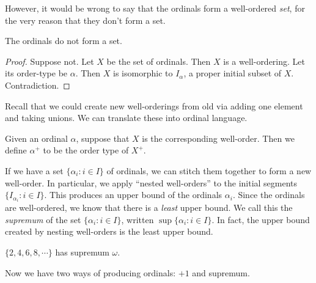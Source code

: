 \documentclass[a4paper]{article}
\begin{document}
However, it would be wrong to say that the ordinals form a well-ordered \emph{set}, for the very reason that they don't form a set.
\begin{thm}
  The ordinals do not form a set.
\end{thm}

\begin{proof}
  Suppose not. Let $X$ be the set of ordinals. Then $X$ is a well-ordering. Let its order-type be $\alpha$. Then $X$ is isomorphic to $I_\alpha$, a proper initial subset of $X$. Contradiction.
\end{proof}

Recall that we could create new well-orderings from old via adding one element and taking unions. We can translate these into ordinal language.

Given an ordinal $\alpha$, suppose that $X$ is the corresponding well-order. Then we define $\alpha^+$ to be the order type of $X^+$.

If we have a set $\{\alpha_i: i \in I\}$ of ordinals, we can stitch them together to form a new well-order. In particular, we apply ``nested well-orders'' to the initial segments $\{I_{\alpha_i}: i \in I\}$. This produces an upper bound of the ordinals $\alpha_i$. Since the ordinals are well-ordered, we know that there is a \emph{least} upper bound. We call this the \emph{supremum} of the set $\{\alpha_i: i \in I\}$, written $\sup\{\alpha_i: i \in I\}$. In fact, the upper bound created by nesting well-orders is the least upper bound.

\begin{eg}
  $\{2, 4, 6, 8, \cdots\}$ has supremum $\omega$.
\end{eg}

Now we have two ways of producing ordinals: $+1$ and supremum.
\end{document}
